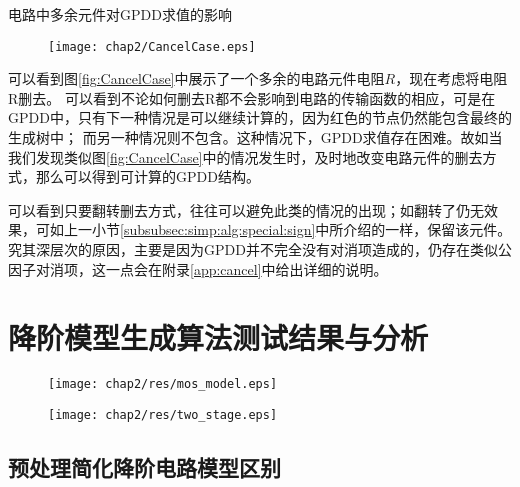 \begin{exmp}
电路中多余元件对GPDD求值的影响
	
\begin{figure}[!htp]
	\centering
	\texttt{[image: chap2/CancelCase.eps]}
\end{figure}

可以看到图\ref{fig:CancelCase}中展示了一个多余的电路元件电阻$R$，现在考虑将电阻R删去。
可以看到不论如何删去R都不会影响到电路的传输函数的相应，可是在GPDD中，只有下一种情况是可以继续计算的，因为红色的节点仍然能包含最终的生成树中；
而另一种情况则不包含。这种情况下，GPDD求值存在困难。故如当我们发现类似图\ref{fig:CancelCase}中的情况发生时，及时地改变电路元件的删去方式，那么可以得到可计算的GPDD结构。

\end{exmp}

可以看到只要翻转删去方式，往往可以避免此类的情况的出现；如翻转了仍无效果，可如上一小节\ref{subsubsec:simp:alg:special:sign}中所介绍的一样，保留该元件。
究其深层次的原因，主要是因为GPDD并不完全没有对消项造成的，仍存在类似公因子对消项，这一点会在附录\ref{app:cancel}中给出详细的说明。

\section{降阶模型生成算法测试结果与分析}
\label{sec:simp:res}

\begin{figure}[!htp]
	\centering
	\texttt{[image: chap2/res/mos\_model.eps]}
\end{figure}

\begin{figure}[!htp]
	\centering
	\texttt{[image: chap2/res/two\_stage.eps]}
\end{figure}

\subsection{预处理简化降阶电路模型区别}
\label{subsec:simp:res:pre}

